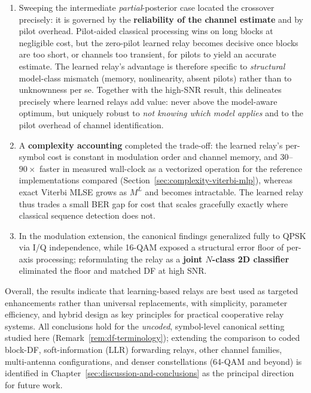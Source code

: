 \begin{enumerate}
    \item Sweeping the intermediate \emph{partial}-posterior case located the crossover precisely: it is governed by the \textbf{reliability of the channel estimate} and by pilot overhead. Pilot-aided classical processing wins on long blocks at negligible cost, but the zero-pilot learned relay becomes decisive once blocks are too short, or channels too transient, for pilots to yield an accurate estimate. The learned relay's advantage is therefore specific to \emph{structural} model-class mismatch (memory, nonlinearity, absent pilots) rather than to unknownness per se. Together with the high-SNR result, this delineates precisely where learned relays add value: never above the model-aware optimum, but uniquely robust to \emph{not knowing which model applies} and to the pilot overhead of channel identification.

    \item A \textbf{complexity accounting} completed the trade-off: the learned relay's per-symbol cost is constant in modulation order and channel memory, and $30$--$90\times$ faster in measured wall-clock as a vectorized operation for the reference implementations compared (Section~\ref{sec:complexity-viterbi-mlp}), whereas exact Viterbi MLSE grows as $M^{L}$ and becomes intractable. The learned relay thus trades a small BER gap for cost that scales gracefully exactly where classical sequence detection does not.

    \item In the modulation extension, the canonical findings generalized fully to QPSK via I/Q independence, while 16-QAM exposed a structural error floor of per-axis processing; reformulating the relay as a \textbf{joint $N$-class 2D classifier} eliminated the floor and matched DF at high SNR.
\end{enumerate}

Overall, the results indicate that learning-based relays are best used as targeted enhancements rather than universal replacements, with simplicity, parameter efficiency, and hybrid design as key principles for practical cooperative relay systems. All conclusions hold for the \emph{uncoded}, symbol-level canonical setting studied here (Remark~\ref{rem:df-terminology}); extending the comparison to coded block-DF, soft-information (LLR) forwarding relays, other channel families, multi-antenna configurations, and denser constellations (64-QAM and beyond) is identified in Chapter~\ref{sec:discussion-and-conclusions} as the principal direction for future work.
